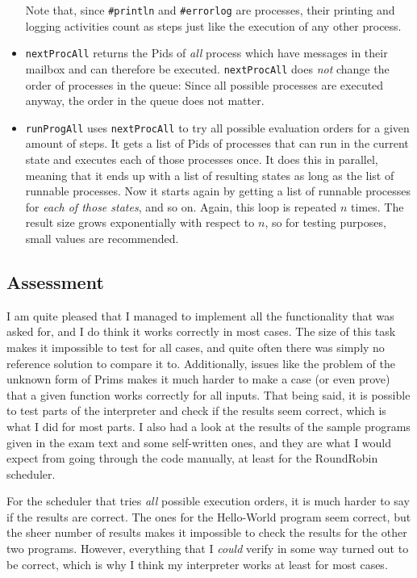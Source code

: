 \documentclass[a4paper]{article}
\begin{document}
\begin{itemize}
  Note that, since \texttt{\#println} and \texttt{\#errorlog} are processes, their printing and logging activities count as steps just like the execution of any other process.
  \item \texttt{nextProcAll} returns the Pids of \emph{all} process which have messages in their mailbox and can therefore be executed. \texttt{nextProcAll} does \emph{not} change the order of processes in the queue: Since all possible processes are executed anyway, the order in the queue does not matter.
  \item \texttt{runProgAll} uses \texttt{nextProcAll} to try all possible evaluation orders for a given amount of steps. It gets a list of Pids of processes that can run in the current state and executes each of those processes once. It does this in parallel, meaning that it ends up with a list of resulting states as long as the list of runnable processes. Now it starts again by getting a list of runnable processes for \emph{each of those states}, and so on. Again, this loop is repeated $n$ times. The result size grows exponentially with respect to $n$, so for testing purposes, small values are recommended.
\end{itemize}

\subsection*{Assessment}
I am quite pleased that I managed to implement all the functionality that was asked for, and I do think it works correctly in most cases. The size of this task makes it impossible to test for all cases, and quite often there was simply no reference solution to compare it to. Additionally, issues like the problem of the unknown form of Prims makes it much harder to make a case (or even prove) that a given function works correctly for all inputs. That being said, it is possible to test parts of the interpreter and check if the results seem correct, which is what I did for most parts. I also had a look at the results of the sample programs given in the exam text and some self-written ones, and they are what I would expect from going through the code manually, at least for the RoundRobin scheduler. 

For the scheduler that tries \emph{all} possible execution orders, it is much harder to say if the results are correct. The ones for the Hello-World program seem correct, but the sheer number of results makes it impossible to check the results for the other two programs. However, everything that I \emph{could} verify in some way turned out to be correct, which is why I think my interpreter works at least for most cases. 
\end{document}
